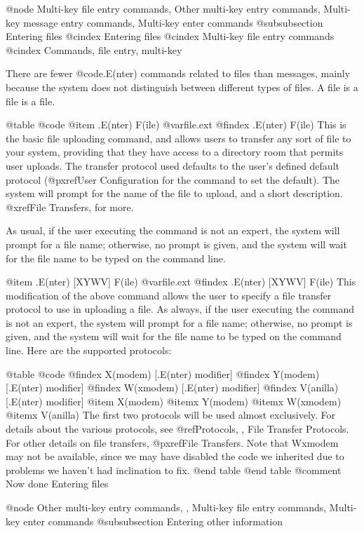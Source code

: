 @node Multi-key file entry commands, Other multi-key entry commands, Multi-key message entry commands, Multi-key enter commands
@subsubsection Entering files
@cindex Entering files
@cindex Multi-key file entry commands
@cindex Commands, file entry, multi-key

There are fewer @code{.E(nter)} commands related to files than messages,
mainly because the system does not distinguish between different types of
files.  A file is a file is a file.

@table @code
@item .E(nter) F(ile) @var{file.ext}
@findex .E(nter) F(ile)
This is the basic file uploading command, and allows users to
transfer any sort of file to your system, providing that they have
access to a directory room that permits user uploads.  The transfer
protocol used defaults to the user's defined default protocol
(@pxref{User Configuration} for the command to set the default).
The system will
prompt for the name of the file to upload, and a short description.
@xref{File Transfers}, for more.

As usual, if the user executing the
command is not an expert, the system will prompt for a file name;
otherwise, no prompt is given, and the system will wait for the file
name to be typed on the command line.

@item .E(nter) [XYWV] F(ile) @var{file.ext}
@findex .E(nter) [XYWV] F(ile)
This modification of the above command allows the user to
specify a file transfer protocol to use in uploading a file.
As always, if the user executing the
command is not an expert, the system will prompt for a file name;
otherwise, no prompt is given, and the system will wait for the file
name to be typed on the command line.  Here are the supported
protocols:

@table @code
@findex X(modem) [.E(nter) modifier]
@findex Y(modem) [.E(nter) modifier]
@findex W(xmodem) [.E(nter) modifier]
@findex V(anilla) [.E(nter) modifier]
@item X(modem)
@itemx Y(modem)
@itemx W(xmodem)
@itemx V(anilla)
The first two protocols will be used almost exclusively.  For
details about the various protocols, see
@ref{Protocols, , File Transfer Protocols}.  For other details on
file transfers, @pxref{File Transfers}.  Note that Wxmodem
may not be available, since we may have disabled the code we
inherited due to problems we haven't had inclination to fix.
@end table
@end table
@comment Now done Entering files

@node Other multi-key entry commands,  , Multi-key file entry commands, Multi-key enter commands
@subsubsection Entering other information

